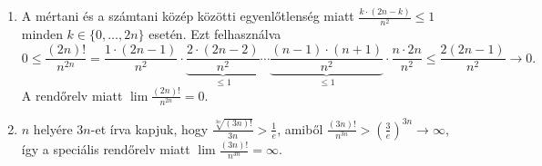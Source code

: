 \documentclass[11pt]{scrartcl}
\begin{document}
\begin{enumerate}
	\item A mértani és a számtani közép közötti egyenlőtlenség miatt
	      \(
	      \frac{k \cdot (2n - k)}{n^2} \le 1
	      \)
	      minden $k \in \{0, \ldots, 2n\}$ esetén. Ezt felhasználva
	      \[
		      0
		      \le \frac{(2n)!}{n^{2n}}
		      = \frac{1 \cdot (2n - 1)}{n^2}
		      \cdot \underbrace{\frac{2 \cdot (2n - 2)}{n^2}}_{\le 1}
		      \cdots
		      \underbrace{\frac{(n - 1) \cdot (n + 1)}{n^2}}_{\le 1}
		      \cdot \frac{n \cdot 2n}{n^2}
		      \le \frac{2(2n - 1)}{n^2}
		      \to 0.
	      \]
	      A rendőrelv miatt
	      \(\displaystyle \lim \frac{(2n)!}{n^{2n}} = 0\).

	\item $n$ helyére $3n$-et írva kapjuk, hogy
	      \(\displaystyle \frac{\sqrt[3n]{(3n)!}}{3n} > \frac{1}{e}\),
	      amiből
	      \(\displaystyle
	      \frac{(3n)!}{n^{3n}} > \left(\frac{3}{e}\right)^{3n} \to \infty
	      \),
	      így a speciális rendőrelv miatt
	      \(\displaystyle \lim \frac{(3n)!}{n^{3n}} = \infty\).
\end{enumerate}
\end{document}
